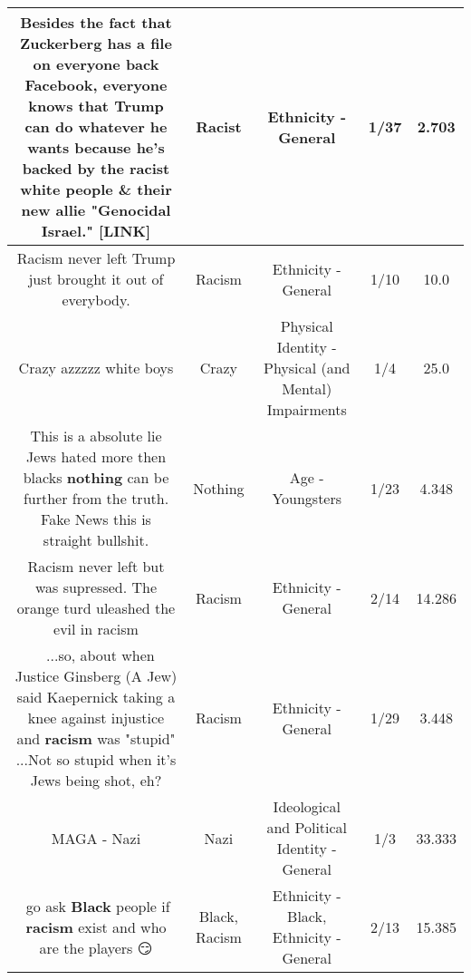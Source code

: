 \documentclass[11pt]{article}
\newlength\mylength
\begin{document}
\begin{center}
\begin{longtable}{|C{.65\mylength}|C{.30\mylength}|C{.12\mylength}|C{.12\mylength}|C{.12\mylength}|}
  \small Besides the fact that Zuckerberg has a file on everyone back \@ Facebook, everyone knows that Trump can do whatever he wants because he's backed by the \textbf{racist} white people \& their new allie "Genocidal Israel."  [LINK] \normalsize   & Racist & Ethnicity - General & 1/37 & 2.703 \\  \hline
  \small Racism never left Trump just brought it out of everybody.\normalsize   & Racism & Ethnicity - General & 1/10 & 10.0 \\  \hline
  \small Crazy azzzzz white boys\normalsize   & Crazy & Physical Identity - Physical (and Mental) Impairments & 1/4 & 25.0 \\  \hline
  \small This is a absolute lie Jews hated more then blacks \textbf{nothing} can be further from the truth.  Fake News this is straight bullshit.\normalsize   & Nothing & Age - Youngsters & 1/23 & 4.348 \\  \hline
  \small Racism never left but was supressed. The orange turd uleashed the evil in racism\normalsize   & Racism & Ethnicity - General & 2/14 & 14.286 \\  \hline
  \small 🤔 ...so, about when Justice Ginsberg (A Jew) said Kaepernick taking a knee against  injustice and \textbf{racism}  was "stupid" ...Not so stupid when it's Jews being shot, eh?\normalsize   & Racism & Ethnicity - General & 1/29 & 3.448 \\  \hline
  \small MAGA - Nazi\normalsize   & Nazi &  Ideological and Political Identity - General & 1/3 & 33.333 \\  \hline
  \small 🤔go ask \textbf{Black} people if \textbf{racism} exist and who are the players 😏\normalsize   & Black, Racism & Ethnicity - Black, Ethnicity - General & 2/13 & 15.385 \\  \hline

\end{longtable}
\end{center}
\end{document}
